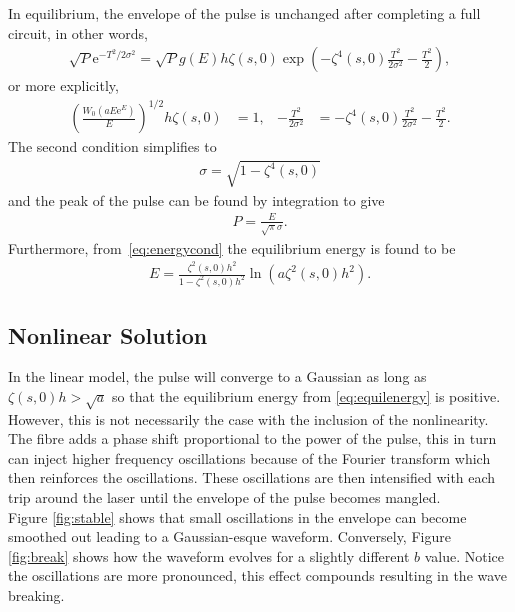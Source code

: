 \documentclass[12pt]{article}
\begin{document}
In equilibrium, the envelope of the pulse is unchanged after completing a full circuit, in other words,
\begin{align*}
	\sqrt{P} \textrm{e}^{-T^2 / 2 \sigma^2} = 
	\sqrt{P} g(E) h \zeta(s, 0) \exp \left( -\zeta^4(s, 0) \frac{T^2}{2 \sigma^2} - \frac{T^2}{2} \right),
\end{align*}
or more explicitly,
\begin{align}
\label{eq:energycond}
	\left( \frac{W_0(a E \textrm{e}^E)}{E} \right)^{1/2} h \zeta(s, 0) &= 1,&
	-\frac{T^2}{2 \sigma^2} &= -\zeta^4(s, 0) \frac{T^2}{2 \sigma^2} - \frac{T^2}{2}.
\end{align}
The second condition simplifies to
\begin{align*}
	\sigma = \sqrt{1 - \zeta^4(s, 0)}
\end{align*}
and the peak of the pulse can be found by integration to give
\begin{align*}
	P = \frac{E}{\sqrt{\pi} \sigma}.
\end{align*}
Furthermore, from~\eqref{eq:energycond} the equilibrium energy is found to be
\begin{align}
	E = \frac{\zeta^2(s, 0) h^2}{1 - \zeta^2(s, 0) h^2} \ln \left( a \zeta^2(s, 0) h^2 \right).
	\label{eq:equilenergy}
\end{align}

\subsection{Nonlinear Solution}
In the linear model, the pulse will converge to a Gaussian as long as $\zeta(s, 0) h > \sqrt a$ so that the equilibrium energy from \eqref{eq:equilenergy} is positive. However, this is not necessarily the case with the inclusion of the nonlinearity. The fibre adds a phase shift proportional to the power of the pulse, this in turn can inject higher frequency oscillations because of the Fourier transform which then reinforces the oscillations. These oscillations are then intensified with each trip around the laser until the envelope of the pulse becomes mangled. \\

Figure \ref{fig:stable} shows that small oscillations in the envelope can become smoothed out leading to a Gaussian-esque waveform. Conversely, Figure \ref{fig:break} shows how the waveform evolves for a slightly different $b$ value. Notice the oscillations are more pronounced, this effect compounds resulting in the wave breaking. \\
\end{document}
